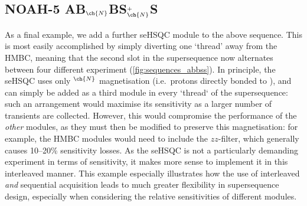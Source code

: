 \documentclass[a4paper,12pt]{article}
\newcommand{\nitrogen}{\ch{^{15}N}}
\newcommand{\magn}[1]{\ch{^1H}$^{#1}$}
\begin{document}
\begin{refsection}
\section{NOAH-5 AB\texorpdfstring{$_{\ch{N}}$}{n}BS\texorpdfstring{$^+_{\ch{N}}$}{+n}S}

As a final example, we add a further \nitrogen{} seHSQC module to the above sequence.
This is most easily accomplished by simply diverting one `thread' away from the \nitrogen{} HMBC, meaning that the second slot in the supersequence now alternates between four different experiment (\cref{fig:sequences_abbss}).
In principle, the \nitrogen{} seHSQC uses only \magn{\ch{N}} magnetisation (i.e.\ protons directly bonded to \nitrogen{}), and can simply be added as a third module in every `thread` of the supersequence: such an arrangement would maximise its sensitivity as a larger number of transients are collected.
However, this would compromise the performance of the \textit{other} modules, as they must then be modified to preserve this magnetisation: for example, the HMBC modules would need to include the $zz$-filter\autocite{Kupce2018CC,Kupce2019JMR}, which generally causes 10--20\% sensitivity losses.
As the \nitrogen{} seHSQC is not a particularly demanding experiment in terms of sensitivity, it makes more sense to implement it in this interleaved manner.
This example especially illustrates how the use of interleaved \textit{and} sequential acquisition leads to much greater flexibility in supersequence design, especially when considering the relative sensitivities of different modules.


\end{refsection}
\end{document}
